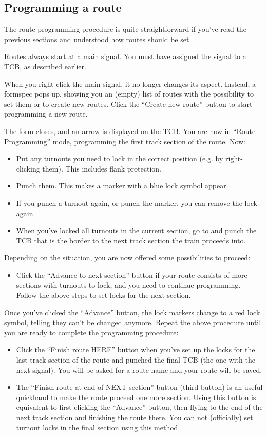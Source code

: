 \documentclass[english]{paper}
\begin{document}
\subsection{Programming a route}

The route programming procedure is quite straightforward if you've
read the previous sections and understood how routes should be set.

Routes always start at a main signal. You must have assigned the signal
to a TCB, as described earlier.

When you right-click the main signal, it no longer changes its aspect.
Instead, a formspec pops up, showing you an (empty) list of routes
with the possibility to set them or to create new routes. Click the
``Create new route'' button to start programming a new route.

The form closes, and an arrow is displayed on the TCB. You are now
in ``Route Programming'' mode, programming the first track section
of the route. Now:
\begin{itemize}
\item Put any turnouts you need to lock in the correct position (e.g. by
right-clicking them). This includes flank protection.
\item Punch them. This makes a marker with a blue lock symbol appear.
\item If you punch a turnout again, or punch the marker, you can remove
the lock again.
\item When you've locked all turnouts in the current section, go to and
punch the TCB that is the border to the next track section the train
proceeds into.
\end{itemize}
Depending on the situation, you are now offered some possibilities
to proceed:
\begin{itemize}
\item Click the ``Advance to next section'' button if your route consists
of more sections with turnouts to lock, and you need to continue programming.
Follow the above steps to set locks for the next section.
\end{itemize}
Once you've clicked the ``Advance'' button, the lock markers change
to a red lock symbol, telling they can't be changed anymore. Repeat
the above procedure until you are ready to complete the programming
procedure:
\begin{itemize}
\item Click the ``Finish route HERE'' button when you've set up the locks
for the last track section of the route and punched the final TCB
(the one with the next signal). You will be asked for a route name
and your route will be saved.
\item The ``Finish route at end of NEXT section'' button (third button)
is an useful quickhand to make the route proceed one more section.
Using this button is equivalent to first clicking the ``Advance''
button, then flying to the end of the next track section and finishing
the route there. You can not (officially) set turnout locks in the
final section using this method.
\end{itemize}
\end{document}
